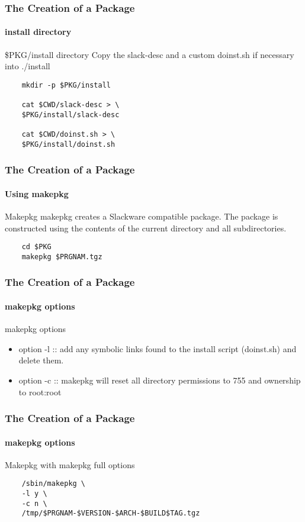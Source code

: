 \documentclass[12pt,hyperref={pdfpagelabels=true}]{beamer}
\begin{document}
\begin{frame}[fragile]
  \frametitle{The Creation of a Package}
  \framesubtitle{install directory}
  \begin{block}{\$PKG/install directory}
    Copy the slack-desc and a custom doinst.sh if necessary into ./install
  \end{block}
  
  \pause
  
  \begin{lstlisting}
    mkdir -p $PKG/install
    
    cat $CWD/slack-desc > \
    $PKG/install/slack-desc
    
    cat $CWD/doinst.sh > \
    $PKG/install/doinst.sh
  \end{lstlisting}
\end{frame}


\begin{frame}[fragile]
  \frametitle{The Creation of a Package}
  \framesubtitle{Using makepkg}
  \begin{block}{Makepkg}
    makepkg creates a Slackware compatible package. The package is constructed
    using the contents of the current directory and all subdirectories.
  \end{block}
  
  \pause
  
  \begin{lstlisting}
    cd $PKG
    makepkg $PRGNAM.tgz
  \end{lstlisting}
\end{frame}

\begin{frame}
  \frametitle{The Creation of a Package}
  \framesubtitle{makepkg options}
  \begin{example}{makepkg options}
    \begin{itemize}[<+-| alert@+>]
    \item option -l :: add any symbolic links found to the install script
      (doinst.sh) and delete them.
    \item option -c :: makepkg will reset all directory permissions to 755 and
      ownership to root:root
    \end{itemize}
  \end{example}
\end{frame}

\begin{frame}[fragile]
  \frametitle{The Creation of a Package}
  \framesubtitle{makepkg options}
  \begin{block}{Makepkg}
    with makepkg full options
  \end{block}
  
  \begin{lstlisting}
    /sbin/makepkg \
    -l y \
    -c n \
    /tmp/$PRGNAM-$VERSION-$ARCH-$BUILD$TAG.tgz
  \end{lstlisting}
\end{frame}
\end{document}
